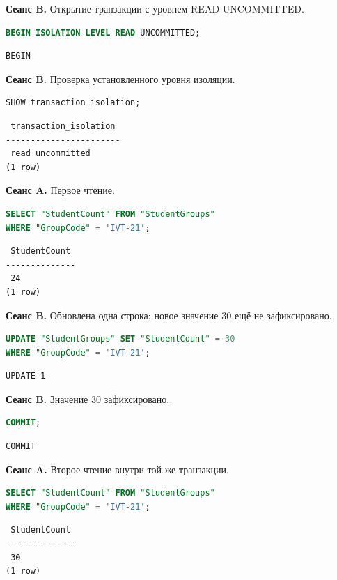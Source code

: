 \documentclass[12pt,a4paper]{article}
\begin{document}
\textbf{Сеанс B.} Открытие транзакции с уровнем READ UNCOMMITTED.
\begin{lstlisting}[language=SQL]
BEGIN ISOLATION LEVEL READ UNCOMMITTED;
\end{lstlisting}

\begin{lstlisting}
BEGIN
\end{lstlisting}

\textbf{Сеанс B.} Проверка установленного уровня изоляции.
\begin{lstlisting}[language=SQL]
SHOW transaction_isolation;
\end{lstlisting}

\begin{lstlisting}
 transaction_isolation
-----------------------
 read uncommitted
(1 row)
\end{lstlisting}

\textbf{Сеанс A.} Первое чтение.
\begin{lstlisting}[language=SQL]
SELECT "StudentCount" FROM "StudentGroups"
WHERE "GroupCode" = 'IVT-21';
\end{lstlisting}

\begin{lstlisting}
 StudentCount
--------------
 24
(1 row)
\end{lstlisting}

\textbf{Сеанс B.} Обновлена одна строка; новое значение 30 ещё не зафиксировано.
\begin{lstlisting}[language=SQL]
UPDATE "StudentGroups" SET "StudentCount" = 30
WHERE "GroupCode" = 'IVT-21';
\end{lstlisting}

\begin{lstlisting}
UPDATE 1
\end{lstlisting}

\textbf{Сеанс B.} Значение 30 зафиксировано.
\begin{lstlisting}[language=SQL]
COMMIT;
\end{lstlisting}

\begin{lstlisting}
COMMIT
\end{lstlisting}

\textbf{Сеанс A.} Второе чтение внутри той же транзакции.
\begin{lstlisting}[language=SQL]
SELECT "StudentCount" FROM "StudentGroups"
WHERE "GroupCode" = 'IVT-21';
\end{lstlisting}

\begin{lstlisting}
 StudentCount
--------------
 30
(1 row)
\end{lstlisting}
\end{document}
